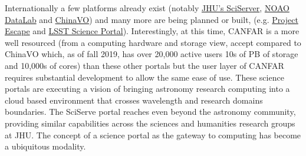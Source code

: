 \documentclass[11pt]{article}
\begin{document}
Internationally a few platforms already exist (notably  \href{http://sciserver.org}{JHU's SciServer}, \href{https://datalab.noao.edu/}{NOAO DataLab} and \href{http://astrocloud.china-vo.org}{ChinaVO}) and many more are being planned or built, (e.g. \href{https://projectescape.eu/services/escape-science-platform}{Project Escape} and \href{https://docushare.lsst.org/docushare/dsweb/Get/LSE-319}{LSST Science Portal}).  
Interestingly, at this time, CANFAR is a more well resourced (from a computing hardware and storage view, accept compared to ChinaVO which, as of fall 2019, has over 20,000 active users 10s of PB of storage and 10,000s of cores) than these other portals but the user layer of CANFAR requires substantial development to allow the same ease of use.
These science portals are executing a vision of bringing astronomy research computing into a cloud based environment that crosses wavelength and research domains boundaries. 
The SciServe portal reaches even beyond the astronomy community, providing similar capabilities across the sciences and humanities research groups at JHU.
The concept of a science portal as the gateway to computing has become a ubiquitous modality. 
\end{document}
